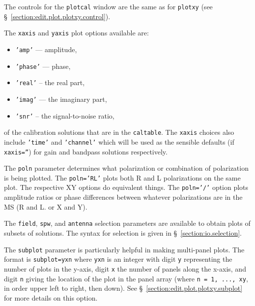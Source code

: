 The controls for the {\tt plotcal} window are the same as for
{\tt plotxy} (see \S~\ref{section:edit.plot.plotxy.control}).

The {\tt xaxis} and {\tt yaxis} plot options available are:
\begin{itemize}
   \item {\tt 'amp'} --- amplitude,
   \item {\tt 'phase'} --- phase,
   \item {\tt 'real'} -- the real part,
   \item {\tt 'imag'} --- the imaginary part,
   \item {\tt 'snr'} -- the signal-to-noise ratio,
\end{itemize}
of the calibration solutions that are in the {\tt caltable}.
The {\tt xaxis} choices also include {\tt 'time'} and {\tt 'channel'}
which will be used as the sensible defaults (if {\tt xaxis=''}) for
gain and bandpass solutions respectively.

The {\tt poln} parameter determines what polarization or combination of
polarization is being plotted.  The {\tt poln='RL'} plots both
R and L polarizations on the same plot.  The respective XY options do
equivalent things.  The {\tt poln='/'} option
plots amplitude ratios or phase differences between whatever
polarizations are in the MS (R and L. or X and Y).  

The {\tt field}, {\tt spw}, and {\tt antenna} selection parameters are
available to obtain plots of subsets of solutions.  The syntax for 
selection is given in \S~\ref{section:io.selection}.

The {\tt subplot} parameter is particularly helpful in making 
multi-panel plots.  The format is  
{\tt subplot=yxn} where {\tt yxn} is an integer with digit
{\tt y} representing the number of plots in the y-axis, digit
{\tt x} the number of panels along the x-axis, and digit {\tt n}
giving the location of the plot in the panel array (where
{\tt n = 1, ..., xy}, in order upper left to right, then down).
See \S~\ref{section:edit.plot.plotxy.subplot} for more details on this
option.

